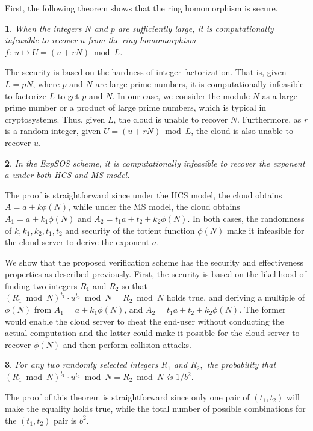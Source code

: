 \documentclass[english,draftcls,onecolumn,11pt]{IEEEtran}
\theoremstyle{definition}
\theoremstyle{plain}
\newtheorem{thm}{\protect\theoremname}
\theoremstyle{plain}
\theoremstyle{definition}
\providecommand{\theoremname}{Theorem}
\begin{document}
First, the following theorem shows that the ring homomorphism is secure.
\begin{thm}
\label{thm:ring-security} When the integers $N$ and $p$ are sufficiently
large, it is computationally infeasible to recover $u$ from the ring
homomorphism $f:\:u\mapsto U=(u+rN)\bmod L$.\end{thm}
\begin{IEEEproof}
The security is based on the hardness of integer factorization. That
is, given $L=pN$, where $p$ and $N$ are large prime numbers, it
is computationally infeasible to factorize $L$ to get $p$ and $N$.
In our case, we consider the module $N$ as a large prime number or
a product of large prime numbers, which is typical in cryptosystems.
Thus, given $L$, the cloud is unable to recover $N$. Furthermore,
as $r$ is a random integer, given $U=(u+rN)\bmod L$, the cloud is
also unable to recover $u$. \end{IEEEproof}
\begin{thm}
In the ExpSOS scheme, it is computationally infeasible to recover
the exponent $a$ under both HCS and MS model.\end{thm}
\begin{IEEEproof}
The proof is straightforward since under the HCS model, the cloud
obtains $A=a+k\phi(N)$, while under the MS model, the cloud obtains
$A_{1}=a+k_{1}\phi(N)$ and $A_{2}=t_{1}a+t_{2}+k_{2}\phi(N)$. In
both cases, the randomness of $k,k_{1},k_{2},t_{1},t_{2}$ and security
of the totient function $\phi(N)$ make it infeasible for the cloud
server to derive the exponent $a.$
\end{IEEEproof}
We show that the proposed verification scheme has the security and
effectiveness properties as described previously. First, the security
is based on the likelihood of finding two integers $R_{1}$ and $R_{2}$
so that $(R_{1}\bmod N)^{t_{1}}\cdot u^{t_{2}}\bmod N=R_{2}\bmod N$
holds true, and deriving a multiple of $\phi(N)$ from $A_{1}=a+k_{1}\phi(N)$,
and $A_{2}=t_{1}a+t_{2}+k_{2}\phi(N)$. The former would enable the
cloud server to cheat the end-user without conducting the actual computation
and the latter could make it possible for the cloud server to recover
$\phi(N)$ and then perform collision attacks. 
\begin{thm}
For any two randomly selected integers $R_{1}$ and $R_{2},$ the
probability that $(R_{1}\bmod N)^{t_{1}}\cdot u^{t_{2}}\bmod N=R_{2}\bmod N$
is $1/b^{2}.$ \end{thm}
\begin{IEEEproof}
The proof of this theorem is straightforward since only one pair of
$(t_{1},t_{2})$ will make the equality holds true, while the total
number of possible combinations for the $(t_{1},t_{2})$ pair is $b^{2}.$ 
\end{IEEEproof}
\end{document}
